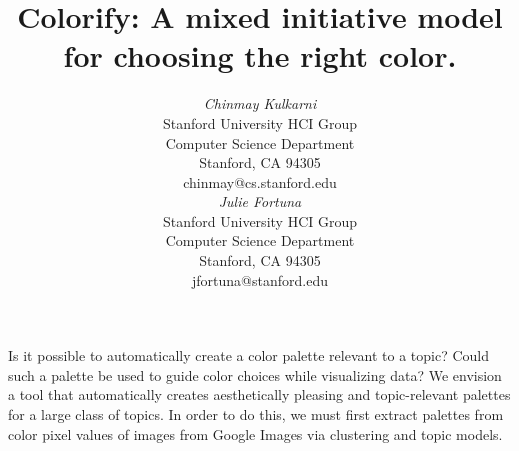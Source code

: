 \documentclass{article}
\begin{document}

 \toappear{}


\title{Colorify: A mixed initiative model for choosing the right color.}


\author{
\parbox[t]{9cm}{\centering
	     {\em Chinmay Kulkarni}\\
	     Stanford University HCI Group\\
              Computer Science Department\\
	     Stanford, CA 94305\\
	     chinmay@cs.stanford.edu}
\parbox[t]{9cm}{\centering
	     {\em Julie Fortuna}\\
	     Stanford University HCI Group\\
              Computer Science Department\\
	     Stanford, CA 94305\\
	     jfortuna@stanford.edu}
}

\maketitle

\abstract
Is it possible to automatically create a color palette relevant to a topic? Could such a palette be used to guide color choices while visualizing data? We envision a tool that automatically creates aesthetically pleasing and topic-relevant palettes for a large class of topics. In order to do this, we must first extract palettes from color pixel values of images from Google Images via clustering and topic models. 

\end{document}
